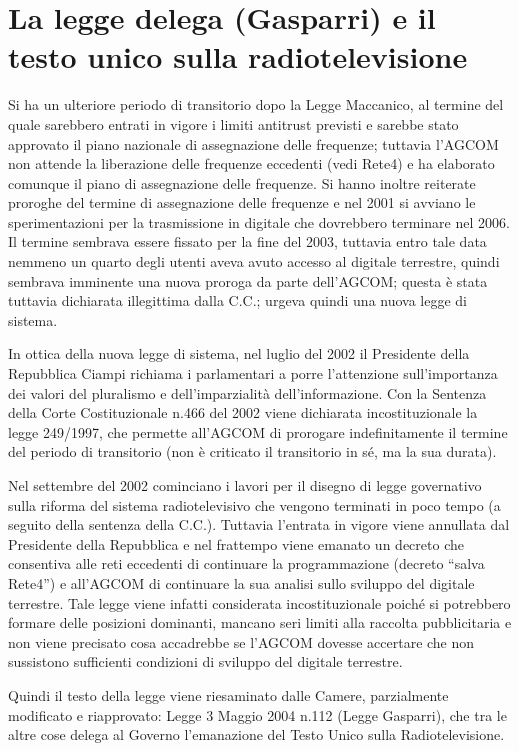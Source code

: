 \section{La legge delega (Gasparri) e il testo unico sulla radiotelevisione}

Si ha un ulteriore periodo di transitorio dopo la Legge Maccanico, al termine del quale sarebbero entrati in vigore i limiti antitrust previsti e sarebbe stato approvato il piano nazionale di assegnazione delle frequenze; tuttavia l’AGCOM non attende la liberazione delle frequenze eccedenti (vedi Rete4) e ha elaborato comunque il piano di assegnazione delle frequenze. Si hanno inoltre reiterate proroghe del termine di assegnazione delle frequenze e nel 2001 si avviano le sperimentazioni per la trasmissione in digitale che dovrebbero terminare nel 2006. Il termine sembrava essere fissato per la fine del 2003, tuttavia entro tale data nemmeno un quarto degli utenti aveva avuto accesso al digitale terrestre, quindi sembrava imminente una nuova proroga da parte dell’AGCOM; questa è stata tuttavia dichiarata illegittima dalla C.C.; urgeva quindi una nuova legge di sistema.


In ottica della nuova legge di sistema, nel luglio del 2002 il Presidente della Repubblica Ciampi richiama i parlamentari a porre l’attenzione sull’importanza dei valori del pluralismo e dell’imparzialità dell’informazione. Con la Sentenza della Corte Costituzionale n.466 del 2002 viene dichiarata incostituzionale la legge 249/1997, che permette all’AGCOM di prorogare indefinitamente il termine del periodo di transitorio (non è criticato il transitorio in sé, ma la sua durata).


Nel settembre del 2002 cominciano i lavori per il disegno di legge governativo sulla riforma del sistema radiotelevisivo che vengono terminati in poco tempo (a seguito della sentenza della C.C.). Tuttavia l’entrata in vigore viene annullata dal Presidente della Repubblica e nel frattempo viene emanato un decreto che consentiva alle reti eccedenti di continuare la programmazione (decreto “salva Rete4”) e all’AGCOM di continuare la sua analisi sullo sviluppo del digitale terrestre. Tale legge viene infatti considerata incostituzionale poiché si potrebbero formare delle posizioni dominanti, mancano seri limiti alla raccolta pubblicitaria e non viene precisato cosa accadrebbe se l’AGCOM dovesse accertare che non sussistono sufficienti condizioni di sviluppo del digitale terrestre.


Quindi il testo della legge viene riesaminato dalle Camere, parzialmente modificato e riapprovato: Legge 3 Maggio 2004 n.112 (Legge Gasparri), che tra le altre cose delega al Governo l’emanazione del Testo Unico sulla Radiotelevisione.

